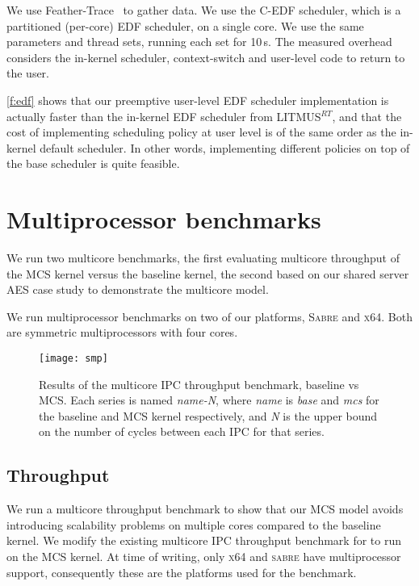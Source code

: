 We use Feather-Trace~\citep{Brandenburg_Anderson_07} to gather data.
We use the C-EDF scheduler, which is a partitioned (per-core) EDF scheduler, on a single
core. We use the same parameters and thread sets, running each set for 10\,s. 
The measured overhead considers the in-kernel scheduler, context-switch and user-level code to return to
the user.

\autoref{f:edf} shows that our preemptive user-level EDF scheduler implementation is
actually faster than the in-kernel EDF scheduler from LITMUS$^{RT}$, and
that the cost of implementing scheduling policy at user level is of
the same order as the in-kernel default scheduler. In other words,
implementing different policies on top of the base scheduler is quite feasible.
\section{Multiprocessor benchmarks}

We run two multicore benchmarks, the first evaluating multicore throughput of the MCS kernel versus the
baseline kernel, the second based on our shared server \gls{AES} case study to demonstrate the
multicore model. 

We run multiprocessor benchmarks on two of our platforms, \textsc{Sabre} and \textsc{x64}. Both 
are symmetric multiprocessors with four cores. 

\begin{figure}[t] 
    \centering
    \texttt{[image: smp]}
    \caption[Results of the multicore IPC throughput benchmark.]{Results of the multicore IPC throughput benchmark, baseline \selfour vs MCS. 
        Each series is named \textit{name-N}, where \textit{name} is \textit{base} and \textit{mcs} for 
        the baseline and MCS kernel respectively, and \textit{N} is the upper
        bound on the number of cycles between each IPC for that series.}
    \label{f:evaluation-smp}
\end{figure}

\subsection{Throughput}

We run a multicore throughput benchmark to show that our MCS model
avoids introducing scalability problems on multiple cores compared to the baseline kernel.
We modify the
existing multicore IPC throughput benchmark for \selfour to run on the MCS kernel. 
At time of writing, only \textsc{x64} and \textsc{sabre} have \selfour multiprocessor support, 
consequently these are the platforms used for the benchmark.

